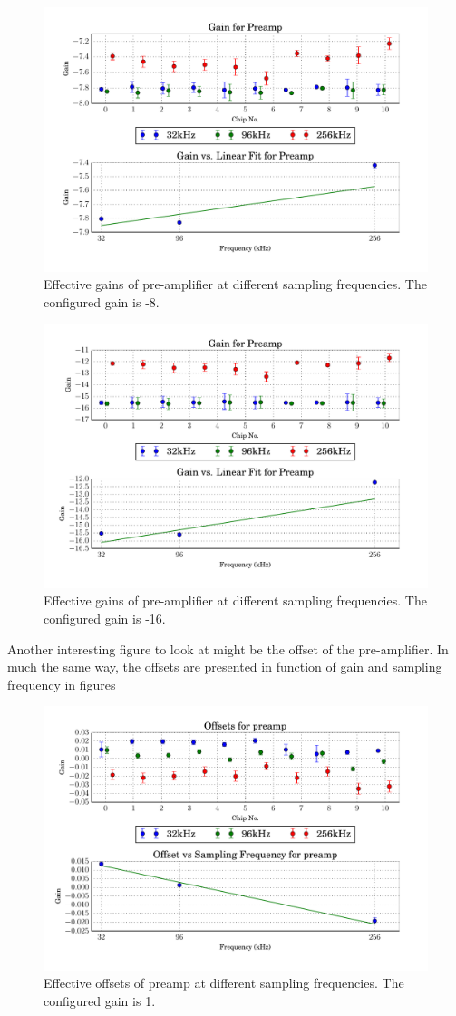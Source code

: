\begin{figure}
    \centering
    \includegraphics[width=.7\linewidth]{images/plots/dc_slope_preamp_gain-8.pdf}
    \caption{Effective gains of pre-amplifier at different sampling frequencies. The configured gain is -8.}
    \label{fig:preamp_slope-8}
\end{figure}
\begin{figure}
    \centering
    \includegraphics[width=.7\linewidth]{images/plots/dc_slope_preamp_gain-16.pdf}
    \caption{Effective gains of pre-amplifier at different sampling frequencies. The configured gain is -16.}
    \label{fig:preamp_slope-16}
\end{figure}

Another   interesting  figure  to  look  at  might  be  the  offset   of   the
pre-amplifier. In much the same way,  the offsets are presented in function of
gain and sampling frequency in figures

\begin{figure}
    \centering
    \includegraphics[width=.7\linewidth]{images/plots/dc_offsets_preamp.pdf}
    \caption{Effective offsets of preamp at different sampling frequencies. The configured gain is 1.}
    \label{fig:preamp_offsets}
\end{figure}

